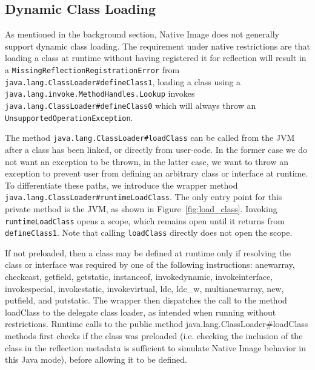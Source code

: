     
\subsection{Dynamic Class Loading}
As mentioned in the background section, Native Image does not generally support dynamic class loading. The requirement under native restrictions are that loading a class at runtime without having registered it for reflection will result in a \verb|MissingReflectionRegistrationError| from \verb|java.lang.ClassLoader#defineClass1|, loading a class using a \verb|java.lang.invoke.MethodHandles.Lookup| invokes \verb|java.lang.ClassLoader#defineClass0| which will always throw an \verb|UnsupportedOperationException|.

The method \verb|java.lang.ClassLoader#loadClass| can be called from the JVM after a class has been linked, or directly from user-code. In the former case we do not want an exception to be thrown, in the latter case, we want to throw an exception to prevent user from defining an arbitrary class or interface at runtime.
To differentiate these paths, we introduce the wrapper method \verb|java.lang.ClassLoader#runtimeLoadClass|. The only entry point for this private method is the JVM, as shown in Figure~\ref{fig:load_class}.
Invoking \verb|runtimeLoadClass| opens a scope, which remains open until it returns from \verb|defineClass1|.
Note that calling \verb|loadClass| directly does not open the scope.

If not preloaded, then a class may be defined at runtime only if resolving the class or interface was required by one of the following instructions:
anewarray, checkcast, getfield, getstatic, instanceof, invokedynamic, invokeinterface, invokespecial,
invokestatic, invokevirtual, ldc, ldc\_w, multianewarray, new, putfield, and putstatic.
The wrapper then dispatches the call to the method loadClass to the delegate class loader, as intended when running without restrictions.
Runtime calls to the public method java.lang.ClassLoader#loadClass methods first checks if the class was preloaded (i.e. checking the inclusion of the class in the reflection metadata is sufficient to simulate Native Image behavior in this Java mode), before allowing it to be defined.

